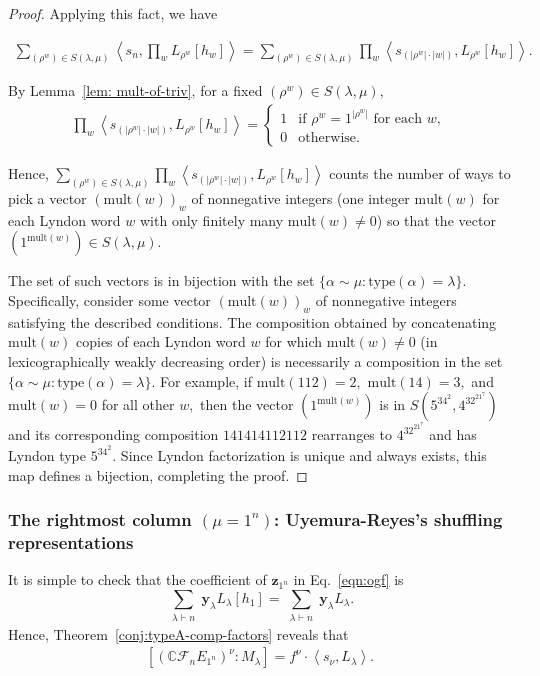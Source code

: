 \documentclass[ALCO, Unicode]{cedram}
\def\C{{\mathbb{C}}}
\def\type{\mathrm{type}}
\begin{document}
\begin{proof}
Applying this fact, we have

\begin{align*}
     \sum_{(\rho^w) \in S(\lambda, \mu)} \left \langle s_n,  \prod_w L_{\rho^w}[h_w] \right \rangle= \sum_{(\rho^w) \in S(\lambda, \mu)}   \prod_w \left \langle s_{(|\rho^w|\cdot |w|)},L_{\rho^w}[h_w] \right \rangle.
    \end{align*}

    By Lemma~\ref{lem: mult-of-triv}, for a fixed $(\rho^w) \in S(\lambda, \mu),$ 
    \begin{align*}
        \prod_w \left \langle s_{(|\rho^w|\cdot |w|)},L_{\rho^w}[h_w] \right \rangle = \begin{cases}
            1 &\text{if $\rho^w = 1^{|\rho^w|}$ for each $w,$}\\
            0 & \text{otherwise.}
        \end{cases}
    \end{align*}

    Hence, $\displaystyle \sum_{(\rho^w) \in S(\lambda, \mu)}   \prod_w \left \langle s_{(|\rho^w|\cdot |w|)},L_{\rho^w}[h_w] \right \rangle$ counts the number of ways to pick a vector $(\mathrm{mult}(w))_w$ of nonnegative integers (one integer $\mathrm{mult}(w)$ for each Lyndon word $w$ with only finitely many $\mathrm{mult}(w) \neq 0$) so that the vector $(1^{\mathrm{mult}(w)}) \in S(\lambda, \mu).$

The set of such vectors is in bijection with the set $\{\alpha \sim \mu: \type(\alpha) = \lambda\}$. Specifically, consider some vector $(\mathrm{mult}(w))_w$ of nonnegative integers satisfying the described conditions. The composition obtained by concatenating $\mathrm{mult}(w)$ copies of each Lyndon word $w$ for which $\mathrm{mult}(w) \neq 0$ (in lexicographically weakly decreasing order) is necessarily a composition in the set $\{\alpha \sim \mu: \type(\alpha) = \lambda\}.$ For example, if $\mathrm{mult}({112}) = 2,$ $\mathrm{mult}({14}) = 3,$ and $\mathrm{mult}(w) = 0$ for all other $w,$ then the vector $(1^{\mathrm{mult}(w)})$ is in $S(5^34^2, 4^32^21^7)$ and its corresponding composition $141414112112$ rearranges to $4^32^21^7$ and has Lyndon type $5^34^2.$ Since Lyndon factorization is unique and always exists, this map defines a bijection, completing the proof.
\end{proof}

\subsubsection{The rightmost column $(\mu = 1^n)$: Uyemura-Reyes's shuffling representations}\label{sec:Uyemura--Reyes}
    It is simple to check that the coefficient of $\mathbf{z}_{1^n}$ in Eq.~\eqref{eqn:ogf} is \[\displaystyle \sum_{\substack{ \lambda \vdash n}}\mathbf{y}_{\lambda}L_\lambda[h_1] = \sum_{\substack{\lambda \vdash n}}\mathbf{y}_{\lambda}L_\lambda.\] Hence, Theorem~\ref{conj:typeA-comp-factors} reveals that 
    \begin{align} \label{eqn:face-algebra}
        [\left(\C \mathcal{F}_n E_{1^n}\right)^\nu: M_\lambda] = f^\nu \cdot \left \langle s_\nu, L_\lambda\right \rangle.
    \end{align}
\end{document}
